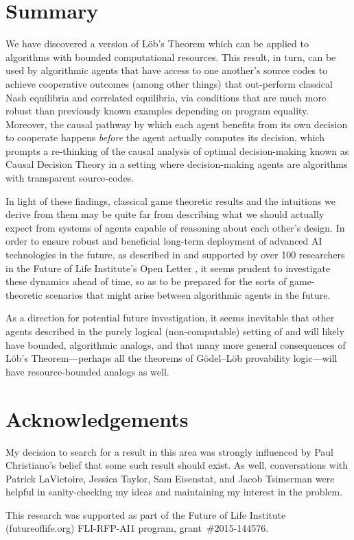 \documentclass[onecolumn,authordate]{miri-tech-article}
\numberwithin{equation}{section}
\theoremstyle{definition}
\renewcommand{\-}{^{-1}}
\begin{document}
\section{Summary}
We have discovered a version of L\"{o}b's Theorem which can be applied to algorithms with bounded computational resources.  This result, in turn, can be used by algorithmic agents that have access to one another's source codes to achieve cooperative outcomes (among other things) that out-perform classical Nash equilibria and correlated equilibria, via conditions that are much more robust than previously known examples depending on program equality.  Moreover, the causal pathway by which each agent benefits from its own decision to cooperate happens {\em before} the agent actually computes its decision, which prompts a re-thinking of the causal analysis of optimal decision-making known as Causal Decision Theory in a setting where decision-making agents are algorithms with transparent source-codes.  

In light of these findings, classical game theoretic results and the intuitions we derive from them may be quite far from describing what we should actually expect from systems of agents capable of reasoning about each other's design.  In order to ensure robust and beneficial long-term deployment of advanced AI technologies in the future, as described in \citet{Russell:2015:ResearchPriorities} and supported by over 100 researchers in the Future of Life Institute's Open Letter \citep{Tegmark:2015:FLIOpenLetter}, it seems prudent to investigate these dynamics ahead of time, so as to be prepared for the sorts of game-theoretic scenarios that might arise between algorithmic agents in the future.

As a direction for potential future investigation, it seems inevitable that other agents described in the purely logical (non-computable) setting of  \citet{Barasz:2014:RobustCooperation} and \citet{LaVictoire:2014:PrisDilemmaLob} will likely have bounded, algorithmic analogs, and that many more general consequences of L\"{o}b's Theorem---perhaps all the theorems of G\"{o}del--L\"{o}b provability logic---will have resource-bounded analogs as well.

\section*{Acknowledgements}
My decision to search for a result in this area was strongly influenced by Paul Christiano's belief that some such result should exist.  As well, conversations with Patrick LaVictoire, Jessica Taylor, Sam Eisenstat, and Jacob Tsimerman were helpful in sanity-checking my ideas and maintaining my interest in the problem.

This research was supported as part of the Future of Life Institute (futureoflife.org) FLI-RFP-AI1 program, grant~\#2015-144576.

\printbibliography
\end{document}
